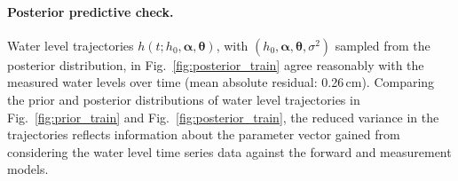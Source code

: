 \documentclass[openacc]{rsproca_new}%
\newcommand\themodel {$h(t; h_0, \boldsymbol \alpha, \boldsymbol\theta)$\xspace}
\newcommand\thevars{h_0, \boldsymbol \alpha, \boldsymbol \theta, \sigma^2}
\begin{document}

\paragraph{Posterior predictive check.} 
Water level trajectories \themodel, with $(\thevars)$ sampled from the posterior distribution, in Fig.~\ref{fig:posterior_train} agree reasonably with the measured water levels over time (mean absolute residual: 0.26\,cm). 
Comparing the prior and posterior distributions of water level trajectories in Fig.~\ref{fig:prior_train} and Fig.~\ref{fig:posterior_train}, the reduced variance in the trajectories reflects information about the parameter vector gained from considering the water level time series data against the forward and measurement models.
\end{document}

